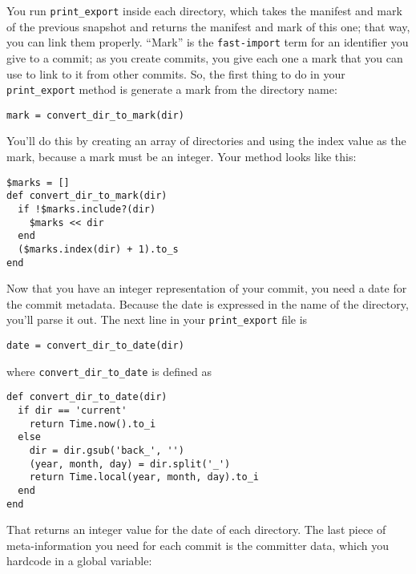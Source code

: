 \documentclass[a4paper]{book}
\begin{document}
You run \texttt{print\_export} inside each directory, which takes the manifest and mark of the previous snapshot and returns the manifest and mark of this one; that way, you can link them properly. “Mark” is the \texttt{fast-import} term for an identifier you give to a commit; as you create commits, you give each one a mark that you can use to link to it from other commits. So, the first thing to do in your \texttt{print\_export} method is generate a mark from the directory name:

\begin{shaded}\begin{verbatim}
mark = convert_dir_to_mark(dir)
\end{verbatim}\end{shaded}

You'll do this by creating an array of directories and using the index value as the mark, because a mark must be an integer. Your method looks like this:

\begin{shaded}\begin{verbatim}
$marks = []
def convert_dir_to_mark(dir)
  if !$marks.include?(dir)
    $marks << dir
  end
  ($marks.index(dir) + 1).to_s
end
\end{verbatim}\end{shaded}

Now that you have an integer representation of your commit, you need a date for the commit metadata. Because the date is expressed in the name of the directory, you'll parse it out. The next line in your \texttt{print\_export} file is

\begin{shaded}\begin{verbatim}
date = convert_dir_to_date(dir)
\end{verbatim}\end{shaded}

where \texttt{convert\_dir\_to\_date} is defined as

\begin{shaded}\begin{verbatim}
def convert_dir_to_date(dir)
  if dir == 'current'
    return Time.now().to_i
  else
    dir = dir.gsub('back_', '')
    (year, month, day) = dir.split('_')
    return Time.local(year, month, day).to_i
  end
end
\end{verbatim}\end{shaded}

That returns an integer value for the date of each directory. The last piece of meta-information you need for each commit is the committer data, which you hardcode in a global variable:
\end{document}
